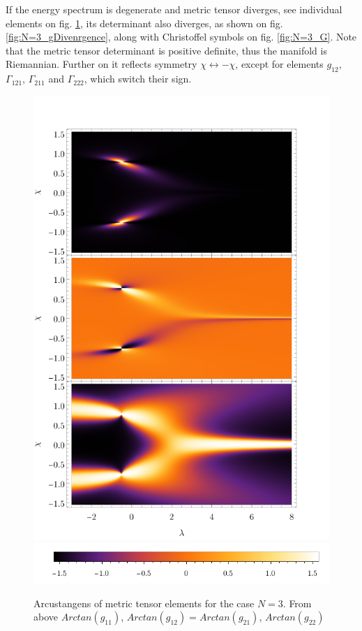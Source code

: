 If the energy spectrum is degenerate and metric tensor diverges, see individual elements on fig. \ref{fig:N=3_g}, its determinant also diverges, as shown on fig. \ref{fig:N=3_gDivenrgence}, along with Christoffel symbols on fig. \ref{fig:N=3_G}. Note that the metric tensor determinant is positive definite, thus the manifold is Riemannian. Further on it reflects symmetry $\chi\leftrightarrow-\chi$, except for elements $g_{12}$, $\Gamma_{121}$, $\Gamma_{211}$ and $\Gamma_{222}$, which switch their sign.
\begin{figure}[H]
    \centering
    \includegraphics[scale=1.3]{../img/N=3_gComponents.pdf}
    \includegraphics[scale=1.3]{../img/N=3_barA.pdf}
    \caption{Arcustangens of metric tensor elements for the case $N=3$. From above $Arctan(g_{11})$, $Arctan(g_{12})=Arctan(g_{21})$, $Arctan(g_{22})$}
    \label{fig:N=3_g}
\end{figure}


